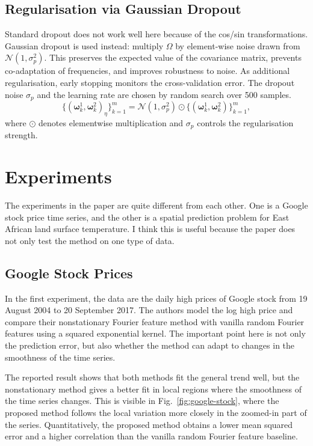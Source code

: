 \documentclass[11pt,a4paper]{article}
\begin{document}
\subsection{Regularisation via Gaussian Dropout}

Standard dropout does not work well here because of the cos/sin
transformations. Gaussian dropout \citep{srivastava2014dropout,
baldi2013understanding} is used instead: multiply $\Omega$ by element-wise
noise drawn from $\mathcal{N}(1, \sigma_p^2)$. This preserves the expected
value of the covariance matrix, prevents co-adaptation of frequencies, and
improves robustness to noise. As additional regularisation, early stopping
\citep{prechelt1998early} monitors the cross-validation error. The dropout
noise $\sigma_p$ and the learning rate are chosen by random search over 500
samples.
\begin{equation}
  \{(\boldsymbol{\omega}^1_k, \boldsymbol{\omega}^2_k)_\eta\}_{k=1}^{m} = \mathcal{N}(1, \sigma_p^2) \odot \{(\boldsymbol{\omega}^1_k, \boldsymbol{\omega}^2_k)\}_{k=1}^{m},
\end{equation}
where $\odot$ denotes elementwise multiplication and $\sigma_p$ controls the regularisation strength.


\section{Experiments}

The experiments in the paper are quite different from each other. One is a
Google stock price time series, and the other is a spatial prediction problem for
East African land surface temperature. I think this is useful because the paper
does not only test the method on one type of data.

\subsection{Google Stock Prices}

In the first experiment, the data are the daily high prices of Google stock from
19 August 2004 to 20 September 2017. The authors model the log high price and
compare their nonstationary Fourier feature method with vanilla random Fourier
features using a squared exponential kernel. The important point here is not only
the prediction error, but also whether the method can adapt to changes in the
smoothness of the time series.

The reported result shows that both methods fit the general trend well, but the
nonstationary method gives a better fit in local regions where the smoothness of
the time series changes. This is visible in Fig.~\ref{fig:google-stock}, where
the proposed method follows the local variation more closely in the zoomed-in
part of the series. Quantitatively, the proposed method obtains a lower mean
squared error and a higher correlation than the vanilla random Fourier feature
baseline.
\end{document}
